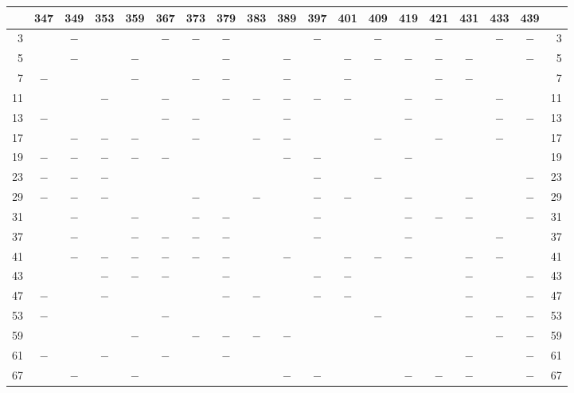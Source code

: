\clearpage
{}%
\begin{center}\begingroup\fontsize{8}{10.5}\selectfont\setlength{\tabcolsep}{2pt}
\begin{tabular}{r|c|c|c|c|c|c|c|c|c|c|c|c|c|c|c|c|c|r}
\hline
 & 347 & 349 & 353 & 359 & 367 & 373 & 379 & 383 & 389 & 397 & 401 & 409 & 419 & 421 & 431 & 433 & 439 & \\
\hline
3 &  & $-$ &  &  & $-$ & $-$ & $-$ &  &  & $-$ &  & $-$ &  & $-$ &  & $-$ & $-$ & 3\\
5 &  & $-$ &  & $-$ &  &  & $-$ &  & $-$ &  & $-$ & $-$ & $-$ & $-$ & $-$ &  & $-$ & 5\\
7 & $-$ &  &  & $-$ &  & $-$ & $-$ &  & $-$ &  & $-$ &  &  & $-$ & $-$ &  &  & 7\\
11 &  &  & $-$ &  & $-$ &  & $-$ & $-$ & $-$ & $-$ & $-$ &  & $-$ & $-$ &  & $-$ &  & 11\\
13 & $-$ &  &  &  & $-$ & $-$ &  &  & $-$ &  &  &  & $-$ &  &  & $-$ & $-$ & 13\\
17 &  & $-$ & $-$ & $-$ &  & $-$ &  & $-$ & $-$ &  &  & $-$ &  & $-$ &  & $-$ &  & 17\\
19 & $-$ & $-$ & $-$ & $-$ & $-$ &  &  &  & $-$ & $-$ &  &  & $-$ &  &  &  &  & 19\\
23 & $-$ & $-$ & $-$ &  &  &  &  &  &  & $-$ &  & $-$ &  &  &  &  & $-$ & 23\\
29 & $-$ & $-$ & $-$ &  &  & $-$ &  & $-$ &  & $-$ & $-$ &  & $-$ &  & $-$ &  & $-$ & 29\\
31 &  & $-$ &  & $-$ &  & $-$ & $-$ &  &  & $-$ &  &  & $-$ & $-$ & $-$ &  & $-$ & 31\\
37 &  & $-$ &  & $-$ & $-$ & $-$ & $-$ &  &  & $-$ &  &  & $-$ &  &  & $-$ &  & 37\\
41 &  & $-$ & $-$ & $-$ & $-$ & $-$ & $-$ &  & $-$ &  & $-$ & $-$ & $-$ &  & $-$ & $-$ &  & 41\\
43 &  &  & $-$ & $-$ & $-$ &  & $-$ &  &  & $-$ & $-$ &  &  &  & $-$ &  & $-$ & 43\\
47 & $-$ &  & $-$ &  &  &  & $-$ & $-$ &  & $-$ & $-$ &  &  &  & $-$ &  & $-$ & 47\\
53 & $-$ &  &  &  & $-$ &  &  &  &  &  &  & $-$ &  &  & $-$ & $-$ & $-$ & 53\\
59 &  &  &  & $-$ &  & $-$ & $-$ & $-$ & $-$ &  &  &  &  &  &  & $-$ & $-$ & 59\\
61 & $-$ &  & $-$ &  & $-$ &  & $-$ &  &  &  &  &  &  &  & $-$ &  & $-$ & 61\\
67 &  & $-$ &  & $-$ &  &  &  &  & $-$ & $-$ &  &  & $-$ & $-$ & $-$ &  & $-$ & 67\\

\end{tabular}
\end{center}
